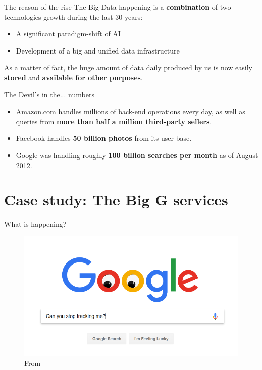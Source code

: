 \documentclass[11pt, british]{beamer}
\begin{document}
	\begin{frame}{The reason of the rise}
			The Big Data happening is a \textbf{combination} of two 
			technologies growth during the last 30 years:
		\begin{itemize}
			\item A significant \alert{paradigm-shift} of AI
			\item Development of a big and unified \alert{data infrastructure}
		\end{itemize}
		As a matter of fact, the \alert{huge amount of data} daily produced by 
		us is now easily \textbf{stored} and \textbf{available for other 
		purposes}.
	\end{frame}
	
	\begin{frame}{The Devil's in the... numbers}
		\begin{itemize}
			\item \alert{Amazon.com} handles millions of back-end operations 
			every day, 
			as well as queries from \textbf{more than half a million 
				third-party 
				sellers}. \parencite{1}
			\item \alert{Facebook} handles \textbf{50 billion photos} from its 
			user 
			base. \parencite{2} 
			\item \alert{Google} was handling roughly \textbf{100 billion 
				searches per month} as of August 2012. \parencite{3} 	
		\end{itemize}
	\end{frame}
	
	\section{Case study: The Big G services}
	
	\begin{frame}{What is happening?}
		\begin{figure}
			\includegraphics[width=1\textwidth]{./Imgs/Prevent-Google-Tracking.png}
			\caption{From \parencite{4}}
		\end{figure}
	\end{frame}
	
\end{document}
